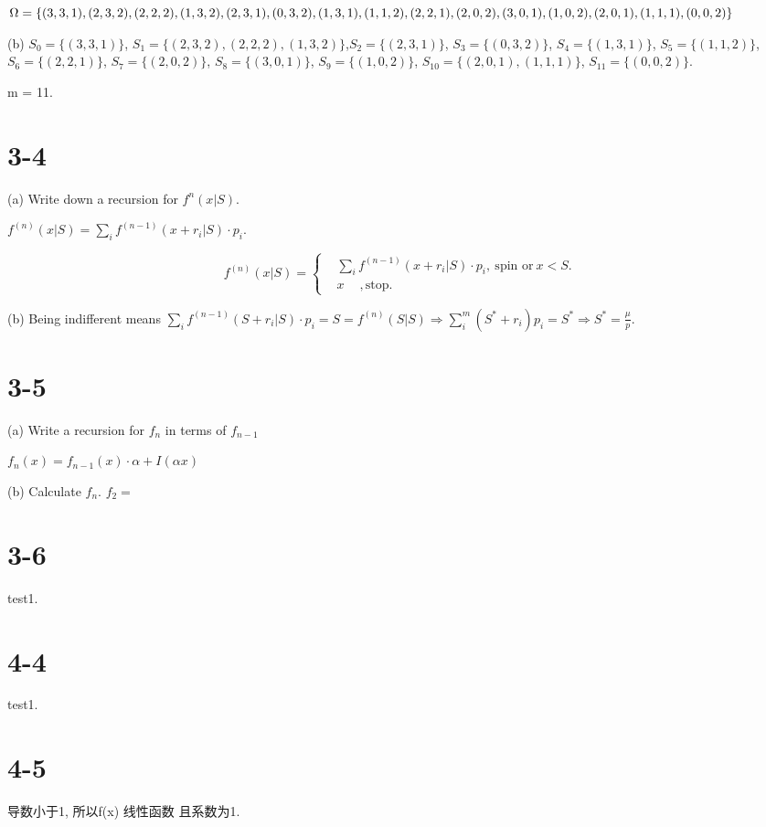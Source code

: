 \documentclass[UTF8]{article}
\begin{document}
$\Omega =\{(3,3,1),(2,3,2),(2,2,2),(1,3,2),(2,3,1),(0,3,2),(1,3,1),\\(1,1,2),(2,2,1),(2,0,2),(3,0,1),(1,0,2),(2,0,1),(1,1,1),(0,0,2)\}$

(b) $S_0 = \{(3,3,1)\}$, $S_1 = \{(2,3,2),(2,2,2),(1,3,2)\}$,$S_2 = \{(2,3,1)\}$, $S_3 = \{(0,3,2)\}$, $S_4 = \{(1,3,1)\}$, $S_5 = \{(1,1,2)\}$, $S_6 = \{(2,2,1)\}$, $S_7 = \{(2,0,2)\}$, $S_8 = \{(3,0,1)\}$, $S_9 = \{(1,0,2)\}$, $S_{10} = \{(2,0,1),(1,1,1)\}$, $S_{11} = \{(0,0,2)\}$.

m = 11.

\section*{3-4}
(a) Write down a recursion for $f^n(x|S)$.

 $f^{(n)}(x|S)= \sum_{i} f^{(n-1)}(x+r_i|S)\cdot p_i$.

 $$ f^{(n)}(x|S)=\left\{
 \begin{aligned}
 & \sum_{i} f^{(n-1)}(x+r_i|S)\cdot p_i,~ \text{spin or}~ x<S.  \\
 & x ~\quad, \text{stop}.
 \end{aligned}
 \right.
 $$

 (b) Being indifferent means $\sum_{i} f^{(n-1)}(S+r_i|S)\cdot p_i = S = f^{(n)}(S|S) \Rightarrow \sum_i^m(S^*+r_i)p_i = S^* \Rightarrow S^* = \frac{\mu}{p}$.

\section*{3-5}
(a) Write a recursion for $f_n$ in terms of $f_{n-1}$

$f_n(x) = f_{n-1}(x) \cdot \alpha + I(\alpha x)$

(b) Calculate $f_n$.
$f_2 = $



\section*{3-6} test1.




\section*{4-4} test1.




\section*{4-5}

导数小于1, 所以f(x) 线性函数 且系数为1.
\end{document}
